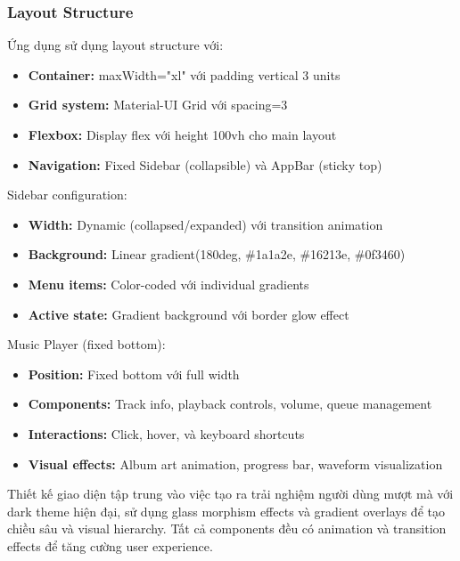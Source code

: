 \subsubsection{Layout Structure}

Ứng dụng sử dụng layout structure với:
\begin{itemize}
    \item \textbf{Container:} maxWidth="xl" với padding vertical 3 units
    \item \textbf{Grid system:} Material-UI Grid với spacing={3}
    \item \textbf{Flexbox:} Display flex với height 100vh cho main layout
    \item \textbf{Navigation:} Fixed Sidebar (collapsible) và AppBar (sticky top)
\end{itemize}

Sidebar configuration:
\begin{itemize}
    \item \textbf{Width:} Dynamic (collapsed/expanded) với transition animation
    \item \textbf{Background:} Linear gradient(180deg, \#1a1a2e, \#16213e, \#0f3460)
    \item \textbf{Menu items:} Color-coded với individual gradients
    \item \textbf{Active state:} Gradient background với border glow effect
\end{itemize}

Music Player (fixed bottom):
\begin{itemize}
    \item \textbf{Position:} Fixed bottom với full width
    \item \textbf{Components:} Track info, playback controls, volume, queue management
    \item \textbf{Interactions:} Click, hover, và keyboard shortcuts
    \item \textbf{Visual effects:} Album art animation, progress bar, waveform visualization
\end{itemize}

Thiết kế giao diện tập trung vào việc tạo ra trải nghiệm người dùng mượt mà với dark theme hiện đại, sử dụng glass morphism effects và gradient overlays để tạo chiều sâu và visual hierarchy. Tất cả components đều có animation và transition effects để tăng cường user experience. 